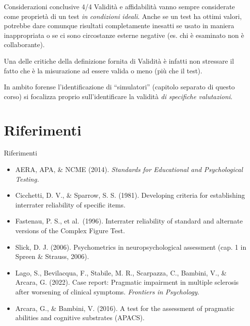 \documentclass[
  ignorenonframetext,
  aspectratio=169,
]{beamer}
\providecommand{\tightlist}{%
  \setlength{\itemsep}{0pt}\setlength{\parskip}{0pt}}
\begin{document}
\begin{frame}{Considerazioni conclusive 4/4}
\label{considerazioni-conclusive-44}
Validità e affidabilità vanno sempre considerate come proprietà di un
test \emph{in condizioni ideali}. Anche se un test ha ottimi valori,
potrebbe dare comunque risultati completamente inesatti se usato in
maniera inappropriata o se ci sono circostanze esterne negative (es. chi
è esaminato non è collaborante).

Una delle critiche della definizione fornita di Validità è infatti non
stressare il fatto che è la misurazione ad essere valida o meno (più che
il test).

In ambito forense l'identificazione di ``simulatori'' (capitolo separato
di questo corso) si focalizza proprio sull'identificare la validità
\emph{di specifiche valutazioni}.
\end{frame}

\section{Riferimenti}\label{riferimenti}

\begin{frame}{Riferimenti}
\label{riferimenti-1}
\footnotesize

\begin{itemize}
\tightlist
\item
  AERA, APA, \& NCME (2014). \emph{Standards for Educational and
  Psychological Testing.}
\item
  Cicchetti, D. V., \& Sparrow, S. S. (1981). Developing criteria for
  establishing interrater reliability of specific items.
\item
  Fastenau, P. S., et al.~(1996). Interrater reliability of standard and
  alternate versions of the Complex Figure Test.
\item
  Slick, D. J. (2006). Psychometrics in neuropsychological assessment
  (cap. 1 in Spreen \& Strauss, 2006).
\item
  Lago, S., Bevilacqua, F., Stabile, M. R., Scarpazza, C., Bambini, V.,
  \& Arcara, G. (2022). Case report: Pragmatic impairment in multiple
  sclerosis after worsening of clinical symptoms. \emph{Frontiers in
  Psychology}.
\item
  Arcara, G., \& Bambini, V. (2016). A test for the assessment of
  pragmatic abilities and cognitive substrates (APACS).
\end{itemize}
\end{frame}
\end{document}
